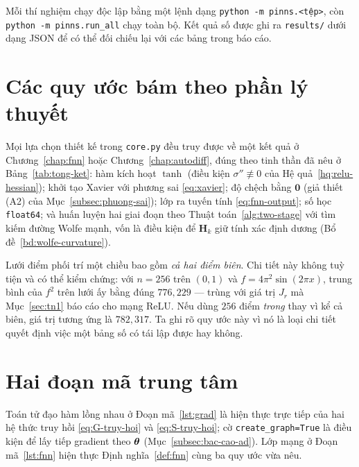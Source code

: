 Mỗi thí nghiệm chạy độc lập bằng một lệnh dạng
\texttt{python -m pinns.<tệp>}, còn \texttt{python -m pinns.run\_all}
chạy toàn bộ. Kết quả số được ghi ra \texttt{results/} dưới dạng JSON để có thể
đối chiếu lại với các bảng trong báo cáo.

\section{Các quy ước bám theo phần lý thuyết}

Mọi lựa chọn thiết kế trong \texttt{core.py} đều truy được về một kết quả ở
Chương~\ref{chap:fnn} hoặc Chương~\ref{chap:autodiff}, đúng theo tinh thần đã nêu
ở Bảng~\ref{tab:tong-ket}: hàm kích hoạt $\tanh$ (điều kiện
$\sigma''\not\equiv 0$ của Hệ quả~\ref{hq:relu-hessian}); khởi tạo Xavier với
phương sai \eqref{eq:xavier}; độ chệch bằng $\bm{0}$ (giả thiết (A2) của
Mục~\ref{subsec:phuong-sai}); lớp ra tuyến tính \eqref{eq:fnn-output}; số học
\texttt{float64}; và huấn luyện hai giai đoạn theo
Thuật toán~\ref{alg:two-stage} với tìm kiếm đường Wolfe mạnh, vốn là điều kiện để
$\bm{H}_k$ giữ tính xác định dương (Bổ đề~\ref{bd:wolfe-curvature}).

\begin{nhanxet}
\label{nx:quy-uoc-luoi}
Lưới điểm phối trí một chiều bao gồm \emph{cả hai điểm biên}. Chi tiết này không
tuỳ tiện và có thể kiểm chứng: với $n = 256$ trên $(0,1)$ và
$f = 4\pi^2\sin(2\pi x)$, trung bình của $f^2$ trên lưới ấy bằng đúng
$776{,}229$ --- trùng với giá trị $J_r$ mà Mục~\ref{sec:tn1} báo cáo cho mạng
ReLU. Nếu dùng $256$ điểm \emph{trong} thay vì kể cả biên, giá trị tương ứng là
$782{,}317$. Ta ghi rõ quy ước này vì nó là loại chi tiết quyết định việc một
bảng số có tái lập được hay không.
\end{nhanxet}

\section{Hai đoạn mã trung tâm}

Toán tử đạo hàm lồng nhau ở Đoạn mã~\ref{lst:grad} là hiện thực trực tiếp của hai
hệ thức truy hồi \eqref{eq:G-truy-hoi} và \eqref{eq:S-truy-hoi}; cờ
\texttt{create\_graph=True} là điều kiện để lấy tiếp gradient theo $\bm{\theta}$
(Mục~\ref{subsec:bac-cao-ad}). Lớp mạng ở Đoạn mã~\ref{lst:fnn} hiện thực
Định nghĩa~\ref{def:fnn} cùng ba quy ước vừa nêu.


